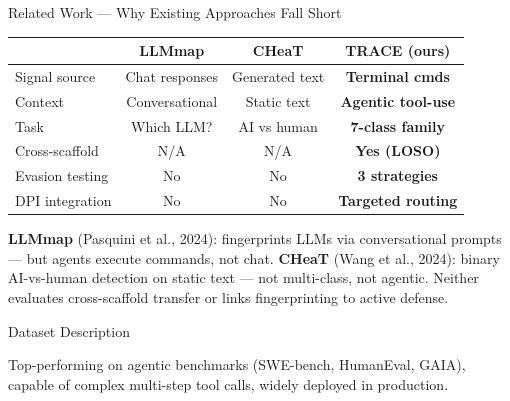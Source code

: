 \documentclass[final]{beamer}
\newlength{\colwidth}
\begin{document}
\begin{frame}[t]
\begin{columns}[t]
\begin{column}{\colwidth}
\begin{block}{Related Work --- Why Existing Approaches Fall Short}
    \begin{table}
      \centering
      \begin{tabular}{l c c c}
        \toprule
        & \textbf{LLMmap} & \textbf{CHeaT} & \textbf{TRACE (ours)} \\
        \midrule
        Signal source & Chat responses & Generated text & \cellcolor{wingreen}\textbf{Terminal cmds} \\
        Context & Conversational & Static text & \cellcolor{wingreen}\textbf{Agentic tool-use} \\
        Task & Which LLM? & AI vs human & \cellcolor{wingreen}\textbf{7-class family} \\
        Cross-scaffold & N/A & N/A & \cellcolor{wingreen}\textbf{Yes (LOSO)} \\
        Evasion testing & No & No & \cellcolor{wingreen}\textbf{3 strategies} \\
        DPI integration & No & No & \cellcolor{wingreen}\textbf{Targeted routing} \\
        \bottomrule
      \end{tabular}
    \end{table}

    \textbf{LLMmap} (Pasquini et al., 2024): fingerprints LLMs via
    conversational prompts --- but agents execute commands, not chat.
    \textbf{CHeaT} (Wang et al., 2024): binary AI-vs-human detection on static
    text --- not multi-class, not agentic. Neither evaluates cross-scaffold
    transfer or links fingerprinting to active defense.

  \end{block}

  \begin{block}{Dataset Description}


    Top-performing on agentic benchmarks (SWE-bench, HumanEval, GAIA),
    capable of complex multi-step tool calls, widely deployed in production.


\end{block}
\end{column}
\end{columns}
\end{frame}
\end{document}
